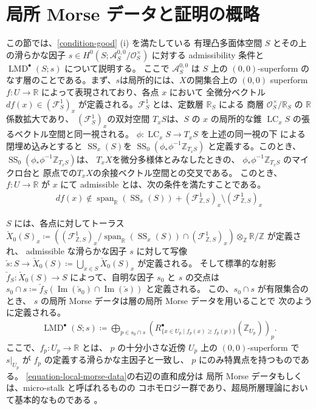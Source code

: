 \documentclass[a4paper,dvipdfmx,reqno,12pt]{amsart}
\theoremstyle{definition}
\newcommand{\deq}{\coloneqq}
\newcommand{\opn}[1]{\operatorname{#1}}
\numberwithin{equation}{section}
\begin{document}
\section{局所 Morse データと証明の概略}
この節では、\cref{condition-good} (i) を満たしている
有理凸多面体空間 $S$ とその上の滑らかな因子
$s\in H^{0}(S;\mathcal{A}_{S}^{0,0}/\mathcal{O}^{\times}_S)$
に対する admissibility 条件と 
$\opn{LMD}^{\bullet}(S;s)$ について説明する。
ここで $\mathcal{A}^{0,0}_S$ は $S$ 上の $(0,0)$-superform
のなす層のことである\cite{MR3903579}。まず、$s$は局所的には、$X$の開集合上の 
$(0,0)$ superform $f\colon U\to \mathbb{R}$
によって表現されており、各点 $x$ において
全微分ベクトル $df(x)\in(\mathcal{F}_{S}^{1})_x$ 
が定義される。$\mathcal{F}_{S}^{1}$ とは、定数層
$\mathbb{R}_S$ による
商層 $\mathcal{O}^{\times}_{S}/\mathbb{R}_{S}$ 
の $\mathbb{R}$ 係数拡大であり、
$(\mathcal{F}_{S}^{1})_x$の双対空間
$T_x S$は、$S$ の $x$ の局所的な錐
$\opn{LC}_x S$ の張るベクトル空間と同一視される。
$\phi \colon \opn{LC}_x S\to T_x S$ を上述の同一視の下
による閉埋め込みとすると
$\opn{SS}_x (S)$を
$\opn{SS}_0(\phi_* \phi^{-1}\mathbb{Z}_{T_x S})$
と定義する。このとき、
$\opn{SS}_0(\phi_* \phi^{-1}\mathbb{Z}_{T_x S})$は、
$T_x X$を微分多様体とみなしたときの、
$\phi_* \phi^{-1}\mathbb{Z}_{T_x S}$ のマイクロ台と
原点での$T_x X$の余接ベクトル空間との交叉である。
このとき、
$f\colon U \to \mathbb{R}$ が $x$ にて admissible 
とは、次の条件を満たすことである。
\begin{align}
df(x)\notin\opn{span}_{\mathbb{R}}(\opn{SS}_x(S))+
(\mathcal{F}_{\mathbb{Z},S}^{1})_x 
\setminus (\mathcal{F}_{\mathbb{Z},S}^{1})_x
\end{align}

$S$ には、各点に対してトーラス
$\check{X}_0(S)_x\deq ((\mathcal{F}^{1}_{\mathbb{Z},S})_x/
\opn{span}_{\mathbb{R}}(\opn{SS}_x(S))\cap 
(\mathcal{F}^{1}_{\mathbb{Z},S})_x)\otimes_{\mathbb{Z}}
\mathbb{R}/\mathbb{Z}$ が定義され、
admissible な滑らかな因子 $s$ に対して写像
$\check{s}\colon S\to \check{X}_0(S)\deq 
\bigcup_{x\in S} \check{X}_0(S)_x$ が定義される。 
そして標準的な射影 $\check{f}_{S}\colon \check{X}_0(S)\to S$
によって、自明な因子 $s_0$ と $s$ の交点は
$s_0\cap s\deq \check{f}_{S}(\opn{Im}(\check{s}_0)\cap 
\opn{Im}(\check{s}))$ と定義される。
この、$s_0\cap s$ が有限集合のとき、
$s$ の局所 Morse データは層の局所 Morse データを用いることで
次のように定義される。
\begin{align} \label{equation-local-morse-data}
\opn{LMD}^{\bullet}(S;s)\deq 
\bigoplus_{p\in s_0\cap s} 
(R^{\bullet}_{\{x\in U_p\mid f_p(x)\geq f_p(p)\}}(\mathbb{Z}_{U_p}))_p.
\end{align}
ここで、$f_p\colon U_p\to \mathbb{R}$ とは、
$p$ の十分小さな近傍 $U_p$ 上の $(0,0)$-superform で
$s|_{U_p}$ が $f_p$ の定義する滑らかな主因子と一致し、
$p$ にのみ特異点を持つものである。 
\cref{equation-local-morse-data}の右辺の直和成分は
局所 Morse データもしくは、micro-stalk と呼ばれるものの
コホモロジー群であり、超局所層理論において基本的なものである
\cite{MR2031639,MR1299726}。
\end{document}
